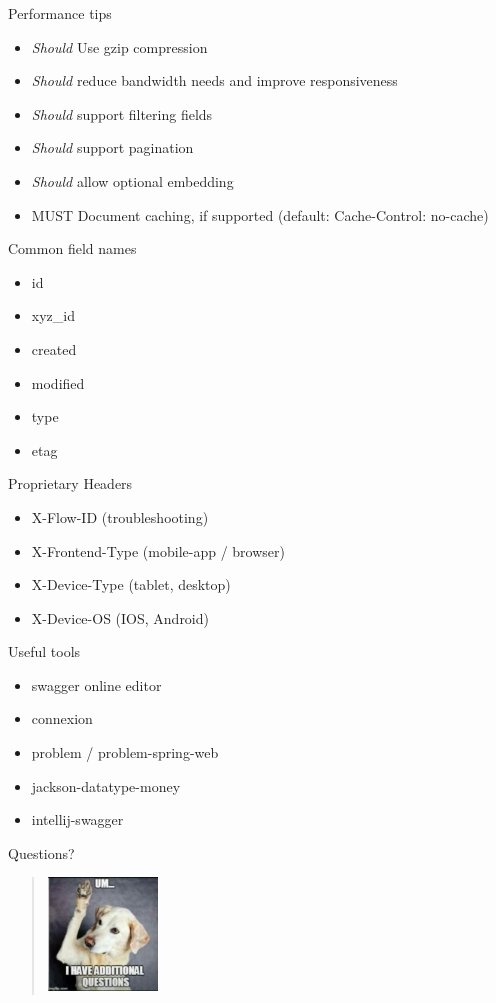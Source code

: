 \documentclass[10pt]{beamer}
\begin{document}
\begin{frame}{Performance tips}
  \begin{itemize}
    \item \emph{Should} Use gzip compression
    \item \emph{Should} reduce bandwidth needs and improve responsiveness
    \item \emph{Should} support filtering fields
    \item \emph{Should} support pagination
    \item \emph{Should} allow optional embedding
    \item MUST Document caching, if supported (default: Cache-Control: no-cache)
  \end{itemize}
\end{frame}

\begin{frame}{Common field names}
  \begin{itemize}
    \item id
    \item xyz\_id
    \item created
    \item modified
    \item type
    \item etag
  \end{itemize}

\end{frame}

\begin{frame}{Proprietary Headers}
  \begin{itemize}
    \item X-Flow-ID (troubleshooting)
    \item X-Frontend-Type (mobile-app / browser)
    \item X-Device-Type (tablet, desktop)
    \item X-Device-OS (IOS, Android)
  \end{itemize}
\end{frame}

\begin{frame}{Useful tools}
  \begin{itemize}
    \item swagger online editor
    \item connexion
    \item problem / problem-spring-web
    \item jackson-datatype-money
    \item intellij-swagger
  \end{itemize}
\end{frame}

\begin{frame}{Questions?}
  \begin{quote}
  	\begin{center}
	  \includegraphics[height=3cm]{dog-i-have-questions-meme.jpg}
  	\end{center}
  \end{quote}
\end{frame}
\end{document}
